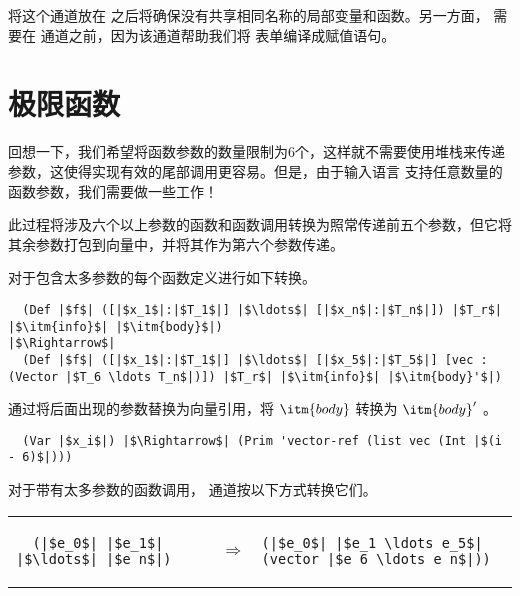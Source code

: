 \documentclass[11pt]{book}
\begin{document}

将这个通道放在  之后将确保没有共享相同名称的局部变量和函数。另一方面，  需要在
 通道之前，因为该通道帮助我们将
 表单编译成赋值语句。

\section{极限函数}
\label{sec:limit-functions-r4}

回想一下，我们希望将函数参数的数量限制为6个，这样就不需要使用堆栈来传递参数，这使得实现有效的尾部调用更容易。但是，由于输入语言 \LangFun{} 支持任意数量的函数参数，我们需要做一些工作！

此过程将涉及六个以上参数的函数和函数调用转换为照常传递前五个参数，但它将其余参数打包到向量中，并将其作为第六个参数传递。

对于包含太多参数的每个函数定义进行如下转换。
\begin{lstlisting}
  (Def |$f$| ([|$x_1$|:|$T_1$|] |$\ldots$| [|$x_n$|:|$T_n$|]) |$T_r$| |$\itm{info}$| |$\itm{body}$|) 
|$\Rightarrow$|
  (Def |$f$| ([|$x_1$|:|$T_1$|] |$\ldots$| [|$x_5$|:|$T_5$|] [vec : (Vector |$T_6 \ldots T_n$|)]) |$T_r$| |$\itm{info}$| |$\itm{body}'$|) 
\end{lstlisting}
通过将后面出现的参数替换为向量引用，将 $\itm{body}$ 转换为 $\itm{body}'$ 。
\begin{lstlisting}
  (Var |$x_i$|) |$\Rightarrow$| (Prim 'vector-ref (list vec (Int |$(i - 6)$|)))
\end{lstlisting}

对于带有太多参数的函数调用，  通道按以下方式转换它们。

\begin{tabular}{lll}
\begin{minipage}{0.2\textwidth}
\begin{lstlisting}
  (|$e_0$| |$e_1$| |$\ldots$| |$e_n$|) 
\end{lstlisting}
\end{minipage}
&
$\Rightarrow$
&
\begin{minipage}{0.4\textwidth}
\begin{lstlisting}
(|$e_0$| |$e_1 \ldots e_5$| (vector |$e_6 \ldots e_n$|))
\end{lstlisting}
\end{minipage}
\end{tabular}
\end{document}
